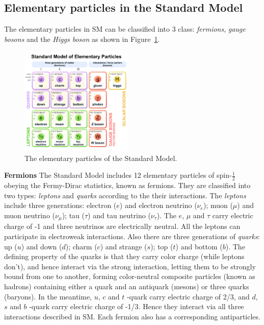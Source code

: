 \subsection{Elementary particles in the Standard Model}
\label{elementaryparticles}

The elementary particles in SM can be classified into 3 class: \textit{fermions}, \textit{gauge bosons} and the \textit{Higgs boson} as shown in Figure~\ref{fig:eleP-1}.
\begin{figure}[!htb]
  \centering
  \includegraphics[width=0.48\textwidth]{figures/Theory/Standard_Model_of_Elementary_Particles.pdf}
  \caption{The elementary particles of the Standard Model.}
  \label{fig:eleP-1}
\end{figure}

\textbf{Fermions}
The Standard Model includes 12 elementary particles of spin-$\frac{1}{2}$ obeying the Fermy-Dirac statistics, known as fermions. 
They are classified into two types: \textit{leptons} and \textit{quarks} according to the their interactions.
The \textit{leptons} include three generations: electron ($e$) and electron neutrino ($\nu_{e}$); 
muon ($\mu$) and muon neutrino ($\nu_{\mu}$); tau ($\tau$) and tau neutrino ($\nu_{\tau}$).
The $e$, $\mu$ and $\tau$ carry electric charge of -1 and three neutrinos are electrically neutral. 
All the leptons can participate in electroweak interactions.
Also there are three generations of \textit{quarks}: up ($u$) and down ($d$); charm ($c$) and strange ($s$); top ($t$) and bottom ($b$).
The defining property of the quarks is that they carry color charge (while leptons don't), and hence interact via the strong interaction, 
letting them to be strongly bound from one to another, forming color-neutral composite 
particles (known as hadrons) containing either a quark and an antiquark (mesons) or three quarks (baryons).
In the meantime, $u$, $c$ and $t$ -quark carry electric charge of 2/3, and $d$, $s$ and $b$ -quark carry electric charge of -1/3. 
Hence they interact via all three interactions described in SM.
Each fermion also has a corresponding antiparticles.

